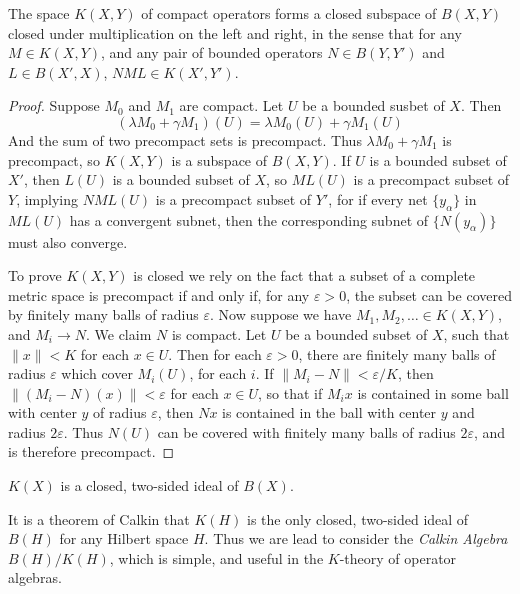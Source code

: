 \begin{theorem}
    The space $K(X,Y)$ of compact operators forms a closed subspace of $B(X,Y)$ closed under multiplication on the left and right, in the sense that for any $M \in K(X,Y)$, and any pair of bounded operators $N \in B(Y,Y')$ and $L \in B(X',X)$, $NML \in K(X',Y')$.
\end{theorem}
\begin{proof}
    Suppose $M_0$ and $M_1$ are compact. Let $U$ be a bounded susbet of $X$. Then
    \[ (\lambda M_0 + \gamma M_1)(U) = \lambda M_0(U) + \gamma M_1(U) \]
    And the sum of two precompact sets is precompact. Thus $\lambda M_0 + \gamma M_1$ is precompact, so $K(X,Y)$ is a subspace of $B(X,Y)$. If $U$ is a bounded subset of $X'$, then $L(U)$ is a bounded subset of $X$, so $ML(U)$ is a precompact subset of $Y$, implying $NML(U)$ is a precompact subset of $Y'$, for if every net $\{ y_\alpha \}$ in $ML(U)$ has a convergent subnet, then the corresponding subnet of $\{ N(y_\alpha) \}$ must also converge.

    To prove $K(X,Y)$ is closed we rely on the fact that a subset of a complete metric space is precompact if and only if, for any $\varepsilon > 0$, the subset can be covered by finitely many balls of radius $\varepsilon$. Now suppose we have $M_1, M_2, \dots \in K(X,Y)$, and $M_i \to N$. We claim $N$ is compact. Let $U$ be a bounded subset of $X$, such that $\| x \| < K$ for each $x \in U$. Then for each $\varepsilon > 0$, there are finitely many balls of radius $\varepsilon$ which cover $M_i(U)$, for each $i$. If $\| M_i - N \| < \varepsilon / K$, then $\| (M_i - N)(x) \| < \varepsilon$ for each $x \in U$, so that if $M_i x$ is contained in some ball with center $y$ of radius $\varepsilon$, then $Nx$ is contained in the ball with center $y$ and radius $2 \varepsilon$. Thus $N(U)$ can be covered with finitely many balls of radius $2\varepsilon$, and is therefore precompact.
\end{proof}

\begin{corollary}
    $K(X)$ is a closed, two-sided ideal of $B(X)$.
\end{corollary}

\begin{remark}
    It is a theorem of Calkin that $K(H)$ is the only closed, two-sided ideal of $B(H)$ for any Hilbert space $H$. Thus we are lead to consider the \emph{Calkin Algebra} $B(H)/K(H)$, which is simple, and useful in the $K$-theory of operator algebras.
\end{remark}


